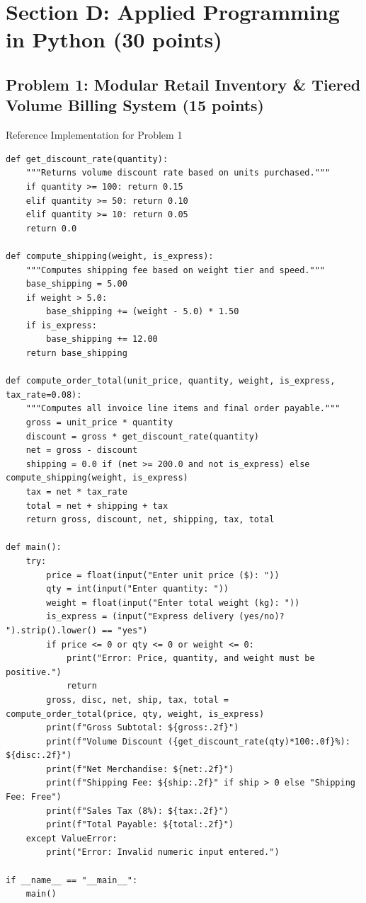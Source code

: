 \documentclass[11pt,a4paper]{article}
\begin{document}
\newpage

\section*{Section D: Applied Programming in Python (30 points)}

\subsection*{Problem 1: Modular Retail Inventory \& Tiered Volume Billing System (15 points)}

\begin{solbox}[top=1.5mm, bottom=1.5mm]{Reference Implementation for Problem 1}
\begin{lstlisting}
def get_discount_rate(quantity):
    """Returns volume discount rate based on units purchased."""
    if quantity >= 100: return 0.15
    elif quantity >= 50: return 0.10
    elif quantity >= 10: return 0.05
    return 0.0

def compute_shipping(weight, is_express):
    """Computes shipping fee based on weight tier and speed."""
    base_shipping = 5.00
    if weight > 5.0:
        base_shipping += (weight - 5.0) * 1.50
    if is_express:
        base_shipping += 12.00
    return base_shipping

def compute_order_total(unit_price, quantity, weight, is_express, tax_rate=0.08):
    """Computes all invoice line items and final order payable."""
    gross = unit_price * quantity
    discount = gross * get_discount_rate(quantity)
    net = gross - discount
    shipping = 0.0 if (net >= 200.0 and not is_express) else compute_shipping(weight, is_express)
    tax = net * tax_rate
    total = net + shipping + tax
    return gross, discount, net, shipping, tax, total

def main():
    try:
        price = float(input("Enter unit price ($): "))
        qty = int(input("Enter quantity: "))
        weight = float(input("Enter total weight (kg): "))
        is_express = (input("Express delivery (yes/no)? ").strip().lower() == "yes")
        if price <= 0 or qty <= 0 or weight <= 0:
            print("Error: Price, quantity, and weight must be positive.")
            return
        gross, disc, net, ship, tax, total = compute_order_total(price, qty, weight, is_express)
        print(f"Gross Subtotal: ${gross:.2f}")
        print(f"Volume Discount ({get_discount_rate(qty)*100:.0f}%): ${disc:.2f}")
        print(f"Net Merchandise: ${net:.2f}")
        print(f"Shipping Fee: ${ship:.2f}" if ship > 0 else "Shipping Fee: Free")
        print(f"Sales Tax (8%): ${tax:.2f}")
        print(f"Total Payable: ${total:.2f}")
    except ValueError:
        print("Error: Invalid numeric input entered.")

if __name__ == "__main__":
    main()
\end{lstlisting}
\end{solbox}
\end{document}
